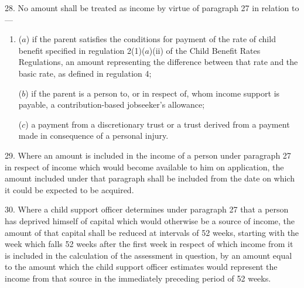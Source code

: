 \documentclass[12pt,a4paper]{article}
\begin{document}
\medskip

28.  No amount shall be treated as income by virtue of paragraph 27 in relation to—
\begin{enumerate}\item[]

($a$) if the parent satisfies the conditions for payment of the rate of child benefit specified in regulation 2(1)($a$)(ii) of the Child Benefit Rates Regulations, an amount representing the difference between that rate and the basic rate, as defined in regulation 4;

($b$) if the parent is a person to, or in respect of, whom income support is payable, %
a contribution-based jobseeker’s allowance;  %

($c$) a payment from a discretionary trust or a trust derived from a payment made in consequence of a personal injury.
\end{enumerate}


\medskip

29.  Where an amount is included in the income of a person under paragraph 27 in respect of income which would become available to him on application, the amount included under that paragraph shall be included from the date on which it could be expected to be acquired.

\medskip

30.  Where a child support officer determines under paragraph 27 that a person has deprived himself of capital which would otherwise be a source of income, the amount of that capital shall be reduced at intervals of 52 weeks, starting with the week which falls 52 weeks after the first week in respect of which income from it is included in the calculation of the assessment in question, by an amount equal to the amount which the child support officer estimates would represent the income from that source in the immediately preceding period of 52 weeks.
\end{document}
